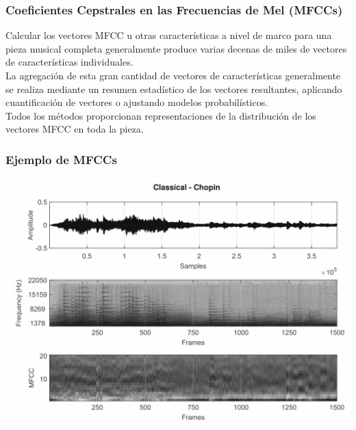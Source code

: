 \documentclass[
10pt, %
aspectratio=169, %
]{beamer}
\begin{document}
	\begin{frame}
		
		\frametitle{Coeﬁcientes Cepstrales en las Frecuencias de Mel (MFCCs)}
						
		Calcular los vectores MFCC u otras características a nivel de marco para una pieza musical completa generalmente produce varias decenas de miles de vectores de características individuales. \\[3mm]
		
		La agregación de esta gran cantidad de vectores de características generalmente se realiza mediante un resumen estadístico de los vectores resultantes, aplicando cuantificación de vectores o ajustando modelos probabilísticos. \\[3mm]
		
		Todos los métodos proporcionan representaciones de la distribución de los vectores MFCC en toda la pieza.  \\[3mm]
			
		\only<2>{
			\textcolor{purple}{¿A qué se parece esto?}
		}
		
		
	\end{frame}
	
	\begin{frame}
		
		\frametitle{Ejemplo de MFCCs}
		
		\centering
		\includegraphics[scale=0.39]{mfcc.png}
		
	\end{frame}
	
\end{document}
